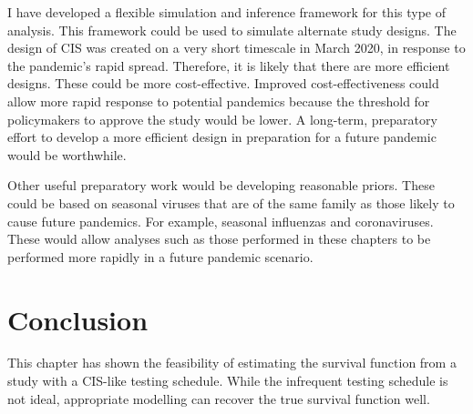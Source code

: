 \documentclass[thesis.tex]{subfiles}
\begin{document}
I have developed a flexible simulation and inference framework for this type of analysis.
This framework could be used to simulate alternate study designs.
The design of CIS was created on a very short timescale in March 2020, in response to the pandemic's rapid spread.
Therefore, it is likely that there are more efficient designs.
These could be more cost-effective.
Improved cost-effectiveness could allow more rapid response to potential pandemics because the threshold for policymakers to approve the study would be lower.
A long-term, preparatory effort to develop a more efficient design in preparation for a future pandemic would be worthwhile.

Other useful preparatory work would be developing reasonable priors.
These could be based on seasonal viruses that are of the same family as those likely to cause future pandemics.
For example, seasonal influenzas and coronaviruses.
These would allow analyses such as those performed in these chapters to be performed more rapidly in a future pandemic scenario.

\section{Conclusion} \label{perf-test:sec:conclusion}
This chapter has shown the feasibility of estimating the survival function from a study with a CIS-like testing schedule.
While the infrequent testing schedule is not ideal, appropriate modelling can recover the true survival function well.

\ifSubfilesClassLoaded{
  \listoftodos
}{}
\end{document}
